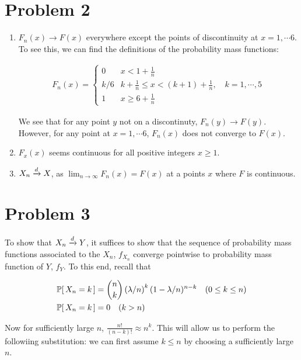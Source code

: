 \documentclass[12pt]{article}%
\begin{document}
\section{Problem 2}
\begin{enumerate}
  \item $F_n(x) \rightarrow F(x)$ everywhere except the points of discontinuity at $x = 1, \cdots 6$. To see this, we can find the definitions of the probability mass functions:

  \begin{align*}
      F_n(x) = \begin{cases}
          0 & x < 1 + \frac{1}{n} \\
          k/6 & k + \frac{1}{n} \leq x < (k+1) + \frac{1}{n}, \quad k= 1, \cdots, 5 \\
          1 & x \geq 6 + \frac{1}{n}
        \end{cases}
  \end{align*}

  We see that for any point $y$ not on a discontinuty, $F_n(y) \rightarrow F(y)$. However, for any point at $x = 1,\cdots 6$, $F_n(x)$ does not converge to $F(x)$.

  \item $F_x(x)$ seems continuous for all positive integers $x \geq 1$.

  \item $X_n \xrightarrow[]{d} X$, as $\lim_{n \rightarrow \infty}F_n(x) = F(x)$ at a points $x$ where $F$ is continuous.
\end{enumerate}

\section{Problem 3}
To show that $X_n \xrightarrow[]{d} Y$, it suffices to show that the sequence of probability mass functions associated to the $X_n$, $f_{X_n}$ converge pointwise to probability mass function of $Y$, $f_Y$. To this end, recall that

\begin{align*}
  \mathbb{P}[\,X_n = k\,] & = {n \choose k}\left(\lambda/n\right)^k(1 - \lambda/n)^{n-k} \quad (0 \leq k \leq n) \\
  \mathbb{P}[\,X_n = k\,] & = 0 \quad (k > n)
\end{align*}

Now for sufficiently large $n$, $\frac{n!}{(n-k)!} \approx n^k$. This will allow us to perform the followiing substitution: we can first assume $k \leq n$ by choosing a sufficiently large $n$.
\end{document}
